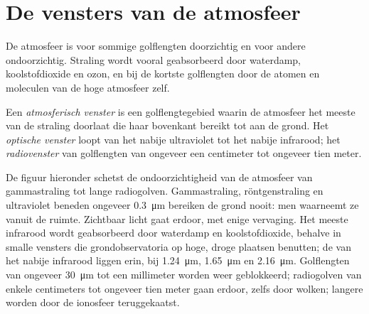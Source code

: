 \section{De vensters van de atmosfeer}

De atmosfeer is voor sommige golflengten doorzichtig en voor andere ondoorzichtig.
Straling wordt vooral geabsorbeerd door waterdamp, koolstofdioxide en ozon, en
bij de kortste golflengten door de atomen en moleculen van de hoge atmosfeer zelf.

\begin{definition}\label{def:b1:observing-the-sky:window}
Een \emph{atmosferisch venster} is een golflengtegebied
waarin de atmosfeer het meeste van de straling doorlaat die haar bovenkant bereikt
tot aan de grond. Het \emph{optische venster} loopt van het nabije ultraviolet
tot het nabije infrarood; het \emph{radiovenster} van golflengten van ongeveer
een centimeter tot ongeveer tien meter.
\end{definition}

De figuur hieronder schetst de ondoorzichtigheid van de atmosfeer van gammastraling
tot lange radiogolven. Gammastraling, röntgenstraling en ultraviolet beneden ongeveer
\qty{0.3}{\micro\metre} bereiken de grond nooit: men waarneemt ze vanuit de ruimte.
Zichtbaar licht gaat erdoor, met enige vervaging. Het meeste infrarood wordt
geabsorbeerd door waterdamp en koolstofdioxide, behalve in smalle vensters die
grondobservatoria op hoge, droge plaatsen benutten; de  van
het nabije infrarood liggen erin, bij \qty{1.24}{\micro\metre},
\qty{1.65}{\micro\metre} en \qty{2.16}{\micro\metre}. Golflengten van ongeveer
\qty{30}{\micro\metre} tot een millimeter worden weer geblokkeerd; radiogolven van
enkele centimeters tot ongeveer tien meter gaan erdoor, zelfs door wolken; langere
worden door de ionosfeer teruggekaatst.

